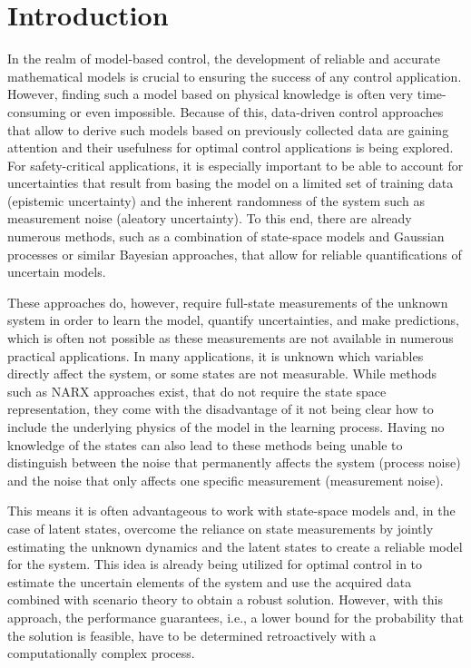 \chapter{Introduction}
\label{sec:introduction}

In the realm of model-based control, the development of reliable and accurate mathematical models is crucial to ensuring the success of any control application. However, finding such a model based on physical knowledge is often very time-consuming or even impossible. Because of this, data-driven control approaches that allow to derive such models based on previously collected data are gaining attention and their usefulness for optimal control applications is being explored. For safety-critical applications, it is especially important to be able to account for uncertainties that result from basing the model on a limited set of training data (epistemic uncertainty) and the inherent randomness of the system such as measurement noise (aleatory uncertainty). To this end, there are already numerous methods, such as a combination of state-space models and Gaussian processes \cite{Williams_06} or similar Bayesian approaches, that allow for reliable quantifications of uncertain models.

These approaches do, however, require full-state measurements of the unknown system in order to learn the model, quantify uncertainties, and make predictions, which is often not possible as these measurements are not available in numerous practical applications. In many applications, it is unknown which variables directly affect the system, or some states are not measurable. While methods such as NARX approaches \cite{Maiworm_21} exist, that do not require the state space representation, they come with the disadvantage of it not being clear how to include the underlying physics of the model in the learning process. Having no knowledge of the states can also lead to these methods being unable to distinguish between the noise that permanently affects the system (process noise) and the noise that only affects one specific measurement (measurement noise). 

This means it is often advantageous to work with state-space models and, in the case of latent states, overcome the reliance on state measurements by jointly estimating the unknown dynamics and the latent states to create a reliable model for the system. This idea is already being utilized for optimal control in \cite{Robert_24} to estimate the uncertain elements of the system and use the acquired data combined with scenario theory \cite{Garatti_22} to obtain a robust solution. However, with this approach, the performance guarantees, i.e., a lower bound for the probability that the solution is feasible, have to be determined retroactively with a computationally complex process.
 
